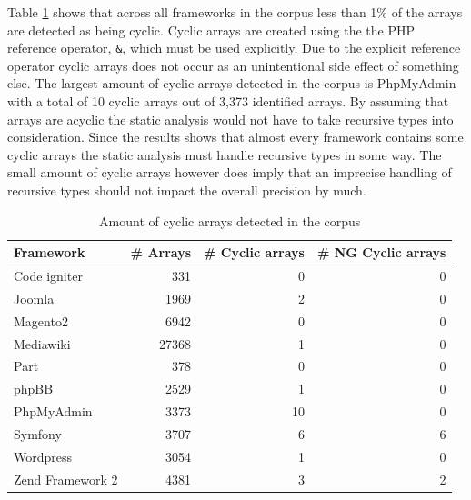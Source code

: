 Table \ref{tab:cyclic_arrays} shows that across all frameworks in the corpus less than 1\% of the arrays are detected as being cyclic. Cyclic arrays are created using the the PHP reference operator, \texttt{\&}, which must be used explicitly. Due to the explicit reference operator cyclic arrays does not occur as an unintentional side effect of something else. The largest amount of cyclic arrays detected in the corpus is PhpMyAdmin with a total of 10 cyclic arrays out of 3,373 identified arrays. By assuming that arrays are acyclic the static analysis would not have to take recursive types into consideration. Since the results shows that almost every framework contains some cyclic arrays the static analysis must handle recursive types in some way. The small amount of cyclic arrays however does imply that an imprecise handling of recursive types should not impact the overall precision by much.

\begin{table}[htbp]
\begin{center}
\begin{tabular}{l| r  r  r}
Framework & \# Arrays & \# Cyclic arrays & \# NG Cyclic arrays  \\ \hline \hline
Code igniter & 331 & 0 & 0 \\
Joomla & 1969 & 2 & 0\\ 
Magento2 & 6942 & 0 & 0\\ 
Mediawiki & 27368 & 1 & 0\\ 
Part & 378 & 0 & 0\\ 
phpBB & 2529 & 1 & 0\\
PhpMyAdmin & 3373 & 10 & 0\\
Symfony & 3707 & 6 & 6\\ %
Wordpress & 3054 & 1 & 0\\ 
Zend Framework 2 & 4381 & 3 & 2
\end{tabular}
\end{center}
\caption{Amount of cyclic arrays detected in the corpus}
\label{tab:cyclic_arrays}
\end{table}

